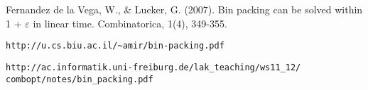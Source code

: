 \documentclass[a4paper,14pt,russian]{article}
\begin{document}
  
\newpage



\renewcommand\refname{\centering Список литературы}
\begin{thebibliography}{9}


Fernandez de la Vega, W., & Lueker, G. (2007). Bin packing can be solved within 1 + $\varepsilon$ in linear time. Combinatorica, 1(4), 349-355.


\begin{verbatim}
http://u.cs.biu.ac.il/~amir/bin-packing.pdf
\end{verbatim}


\begin{verbatim}
http://ac.informatik.uni-freiburg.de/lak_teaching/ws11_12/
combopt/notes/bin_packing.pdf
\end{verbatim}
   
\end{thebibliography}
\end{document}
